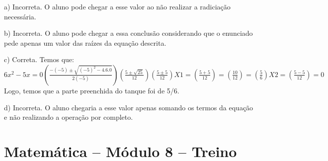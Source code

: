 \begin{enumerate}
a) Incorreta. O aluno pode chegar a esse valor ao não realizar a
radiciação necessária.

b) Incorreta. O aluno pode chegar a essa conclusão considerando que
o enunciado pede apenas um valor das raízes da equação descrita.

c) Correta. Temos que:
$6x^2 - 5x = 0
(\frac{- ( - 5) \pm \sqrt{{( - 5)}^{2} - 4.6.0}}{2( - 5)})
(\frac{5 \pm \sqrt{25}}{12})
(\frac{5 \pm 5}{12})
X1 = (\frac{5 + 5}{12}) = (\frac{10}{12}) = (\frac{5}{6})
X2 = (\frac{5 - 5}{12}) = 0$
Logo, temos que a parte preenchida do tanque foi de 5/6.

d) Incorreta. O aluno chegaria a esse valor apenas somando os
termos da equação e não realizando a operação por completo.
\end{enumerate}


\section*{Matemática – Módulo 8 – Treino}
